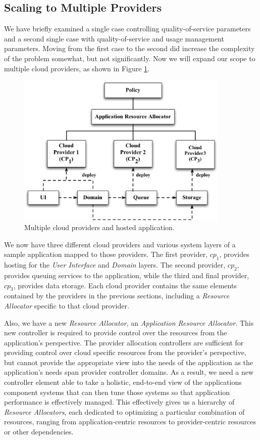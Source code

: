 \documentclass[notitlepage]{book}
\begin{document}
\begin{doublespace}
\subsection{Scaling to Multiple Providers}\label{sec:multiple}
We have briefly examined a single case controlling quality-of-service parameters and a second single case with quality-of-service and usage management parameters.  Moving from the first case to the second did increase the complexity of the problem somewhat, but not significantly.  Now we will expand our scope to multiple cloud providers, as shown in Figure \ref{fig:multiple}.

\begin{figure}[!t]
\centering
\includegraphics[width=4in]{Multiple}
\caption{Multiple cloud providers and hosted application.}
\label{fig:multiple}
\end{figure}

We now have three different cloud providers and various system layers of a sample application mapped to those providers.  The first provider, $cp_1$, provides hosting for the \textit{User Interface} and \textit{Domain} layers.  The second provider, $cp_2$, provides queuing services to the application, while the third and final provider, $cp_3$, provides data storage.  Each cloud provider contains the same elements contained by the providers in the previous sections, including a \textit{Resource Allocator} specific to that cloud provider.

Also, we have a new \textit{Resource Allocator}, an \textit{Application Resource Allocator}.  This new controller is required to provide control over the resources from the application's perspective.  The provider allocation controllers are sufficient for providing control over cloud specific resources from the provider's perspective, but cannot provide the appropriate view into the needs of the application as the application's needs span provider controller domains. As a result, we need a new controller element able to take a holistic, end-to-end view of the applications component systems that can then tune those systems so that application performance is effectively managed.  This effectively gives us a hierarchy of \textit{Resource Allocators}, each dedicated to optimizing a particular combination of resources, ranging from application-centric resources to provider-centric resources or other dependencies.


\end{doublespace}
\end{document}
